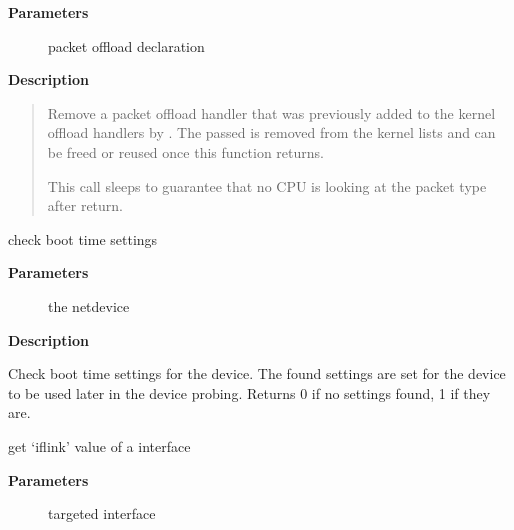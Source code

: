 \documentclass[a4paper,8pt,english]{sphinxmanual}
\begin{document}
\textbf{Parameters}
\begin{description}
\item[{}] \leavevmode
packet offload declaration

\end{description}

\textbf{Description}
\begin{quote}

Remove a packet offload handler that was previously added to the kernel
offload handlers by {\hyperref[networking/kapi:c.dev_add_offload]{\emph{}}}. The passed  is
removed from the kernel lists and can be freed or reused once this
function returns.

This call sleeps to guarantee that no CPU is looking at the packet
type after return.
\end{quote}

\begin{fulllineitems}
\label{networking/kapi:c.netdev_boot_setup_check}
check boot time settings

\end{fulllineitems}


\textbf{Parameters}
\begin{description}
\item[{}] \leavevmode
the netdevice

\end{description}

\textbf{Description}

Check boot time settings for the device.
The found settings are set for the device to be used
later in the device probing.
Returns 0 if no settings found, 1 if they are.

\begin{fulllineitems}
\label{networking/kapi:c.dev_get_iflink}
get `iflink' value of a interface

\end{fulllineitems}


\textbf{Parameters}
\begin{description}
\item[{}] \leavevmode
targeted interface

\end{description}
\end{document}

